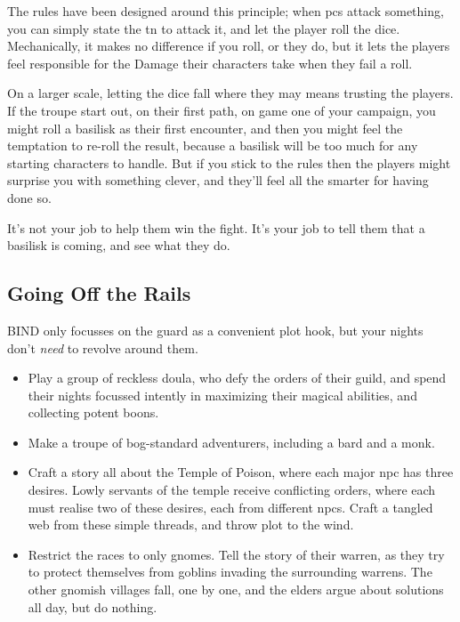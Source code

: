 \begin{multicols}{2}
The rules have been designed around this principle; when \glspl{pc} attack something, you can simply state the \gls{tn} to attack it, and let the player roll the dice.
Mechanically, it makes no difference if you roll, or they do, but it lets the players feel responsible for the Damage their characters take when they fail a roll.

On a larger scale, letting the dice fall where they may means trusting the players.
If the troupe start out, on their first path, on game one of your campaign, you might roll a basilisk as their first encounter, and then you might feel the temptation to re-roll the result, because a basilisk will be too much for any starting characters to handle.
But if you stick to the rules then the players might surprise you with something clever, and they'll feel all the smarter for having done so.

It's not your job to help them win the fight.
It's your job to tell them that a basilisk is coming, and see what they do.

\subsection{Going Off the Rails}

BIND only focusses on the \gls{guard} as a convenient plot hook, but your nights don't \emph{need} to revolve around them.

\begin{itemize}
  \item
  Play a group of reckless doula, who defy the orders of their guild, and spend their nights focussed intently in maximizing their magical abilities, and collecting potent \glspl{boon}.
  \item
  Make a troupe of bog-standard adventurers, including a bard and a monk.
  \item
  Craft a story all about the Temple of Poison, where each major \gls{npc} has three desires.
  Lowly servants of the temple receive conflicting orders, where each must realise two of these desires, each from different \glspl{npc}.
  Craft a tangled web from these simple threads, and throw plot to the wind.
  \item
  Restrict the races to only gnomes.
  Tell the story of their warren, as they try to protect themselves from goblins invading the surrounding warrens.
  The other gnomish villages fall, one by one, and the elders argue about solutions all day, but do nothing.
\end{itemize}


\end{multicols}
